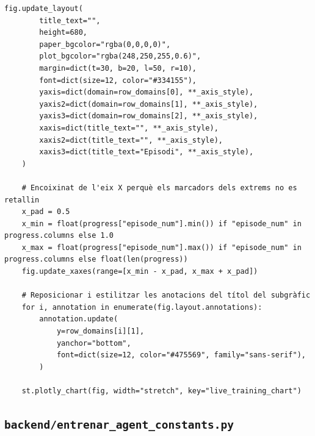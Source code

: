 \documentclass[10pt,a4paper]{article}
\begin{document}
\begin{lstlisting}[style=studioPython,caption={backend/entrenar\_agent\_charts.py},label={lst:backend-entrenar-agent-charts-py}]
    fig.update_layout(
        title_text="",
        height=680,
        paper_bgcolor="rgba(0,0,0,0)",
        plot_bgcolor="rgba(248,250,255,0.6)",
        margin=dict(t=30, b=20, l=50, r=10),
        font=dict(size=12, color="#334155"),
        yaxis=dict(domain=row_domains[0], **_axis_style),
        yaxis2=dict(domain=row_domains[1], **_axis_style),
        yaxis3=dict(domain=row_domains[2], **_axis_style),
        xaxis=dict(title_text="", **_axis_style),
        xaxis2=dict(title_text="", **_axis_style),
        xaxis3=dict(title_text="Episodi", **_axis_style),
    )

    # Encoixinat de l'eix X perquè els marcadors dels extrems no es retallin
    x_pad = 0.5
    x_min = float(progress["episode_num"].min()) if "episode_num" in progress.columns else 1.0
    x_max = float(progress["episode_num"].max()) if "episode_num" in progress.columns else float(len(progress))
    fig.update_xaxes(range=[x_min - x_pad, x_max + x_pad])

    # Reposicionar i estilitzar les anotacions del títol del subgràfic
    for i, annotation in enumerate(fig.layout.annotations):
        annotation.update(
            y=row_domains[i][1],
            yanchor="bottom",
            font=dict(size=12, color="#475569", family="sans-serif"),
        )

    st.plotly_chart(fig, width="stretch", key="live_training_chart")
\end{lstlisting}


\subsection{\texorpdfstring{\texttt{backend/entrenar\_agent\_constants.py}}{backend/entrenar\_agent\_constants.py}}
\end{document}
